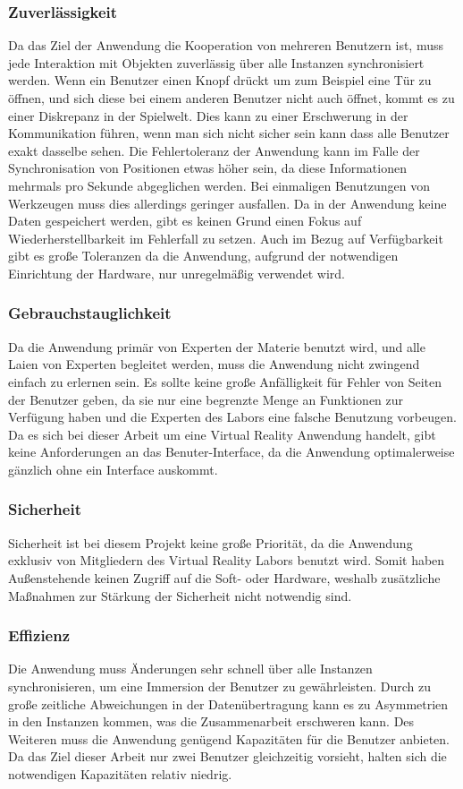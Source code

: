 \subsubsection*{Zuverlässigkeit}
Da das Ziel der Anwendung die Kooperation von mehreren Benutzern ist, muss jede Interaktion mit Objekten zuverlässig über alle Instanzen synchronisiert werden. Wenn ein Benutzer einen Knopf drückt um zum Beispiel eine Tür zu öffnen, und sich diese bei einem anderen Benutzer nicht auch öffnet, kommt es zu einer Diskrepanz in der Spielwelt. Dies kann zu einer Erschwerung in der Kommunikation führen, wenn man sich nicht sicher sein kann dass alle Benutzer exakt dasselbe sehen. Die Fehlertoleranz der Anwendung kann im Falle der Synchronisation von Positionen etwas höher sein, da diese Informationen mehrmals pro Sekunde abgeglichen werden. Bei einmaligen Benutzungen von Werkzeugen muss dies allerdings geringer ausfallen.
Da in der Anwendung keine Daten gespeichert werden, gibt es keinen Grund einen Fokus auf Wiederherstellbarkeit im Fehlerfall zu setzen. Auch im Bezug auf Verfügbarkeit gibt es große Toleranzen da die Anwendung, aufgrund der notwendigen Einrichtung der Hardware, nur unregelmäßig verwendet wird.

\subsubsection*{Gebrauchstauglichkeit}
Da die Anwendung primär von Experten der Materie benutzt wird, und alle Laien von Experten begleitet werden, muss die Anwendung nicht zwingend einfach zu erlernen sein. Es sollte keine große Anfälligkeit für Fehler von Seiten der Benutzer geben, da sie nur eine begrenzte Menge an Funktionen zur Verfügung haben und die Experten des Labors eine falsche Benutzung vorbeugen. Da es sich bei dieser Arbeit um eine Virtual Reality Anwendung handelt, gibt keine Anforderungen an das Benuter-Interface, da die Anwendung optimalerweise gänzlich ohne ein Interface auskommt. 

\subsubsection*{Sicherheit}
Sicherheit ist bei diesem Projekt keine große Priorität, da die Anwendung exklusiv von Mitgliedern des Virtual Reality Labors benutzt wird. Somit haben Außenstehende keinen Zugriff auf die Soft- oder Hardware, weshalb zusätzliche Maßnahmen zur Stärkung der Sicherheit nicht notwendig sind.

\subsubsection*{Effizienz}
Die Anwendung muss Änderungen sehr schnell über alle Instanzen synchronisieren, um eine Immersion der Benutzer zu gewährleisten. Durch zu große zeitliche Abweichungen in der Datenübertragung kann es zu Asymmetrien in den Instanzen kommen, was die Zusammenarbeit erschweren kann. Des Weiteren muss die Anwendung genügend Kapazitäten für die Benutzer anbieten. Da das Ziel dieser Arbeit nur zwei Benutzer gleichzeitig vorsieht, halten sich die notwendigen Kapazitäten relativ niedrig. 

